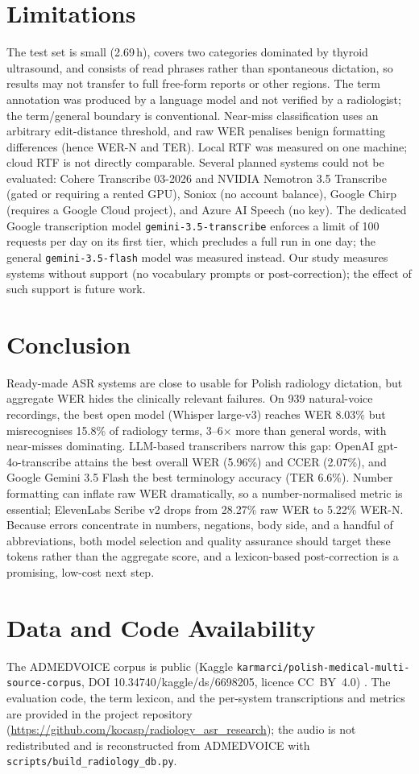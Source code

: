 \documentclass[conference]{IEEEtran}
\begin{document}
\section{Limitations}
The test set is small (2.69\,h), covers two categories dominated by thyroid ultrasound, and consists of read phrases rather than spontaneous dictation, so results may not transfer to full free-form reports or other regions. The term annotation was produced by a language model and not verified by a radiologist; the term/general boundary is conventional. Near-miss classification uses an arbitrary edit-distance threshold, and raw WER penalises benign formatting differences (hence WER-N and TER). Local RTF was measured on one machine; cloud RTF is not directly comparable. Several planned systems could not be evaluated: Cohere Transcribe 03-2026 and NVIDIA Nemotron 3.5 Transcribe (gated or requiring a rented GPU), Soniox (no account balance), Google Chirp (requires a Google Cloud project), and Azure AI Speech (no key). The dedicated Google transcription model \texttt{gemini-3.5-transcribe} enforces a limit of 100 requests per day on its first tier, which precludes a full run in one day; the general \texttt{gemini-3.5-flash} model was measured instead. Our study measures systems without support (no vocabulary prompts or post-correction); the effect of such support is future work.

\section{Conclusion}
Ready-made ASR systems are close to usable for Polish radiology dictation, but aggregate WER hides the clinically relevant failures. On 939 natural-voice recordings, the best open model (Whisper large-v3) reaches WER 8.03\% but misrecognises 15.8\% of radiology terms, 3--6$\times$ more than general words, with near-misses dominating. LLM-based transcribers narrow this gap: OpenAI gpt-4o-transcribe attains the best overall WER (5.96\%) and CCER (2.07\%), and Google Gemini 3.5 Flash the best terminology accuracy (TER 6.6\%). Number formatting can inflate raw WER dramatically, so a number-normalised metric is essential; ElevenLabs Scribe v2 drops from 28.27\% raw WER to 5.22\% WER-N. Because errors concentrate in numbers, negations, body side, and a handful of abbreviations, both model selection and quality assurance should target these tokens rather than the aggregate score, and a lexicon-based post-correction is a promising, low-cost next step.

\section*{Data and Code Availability}
The ADMEDVOICE corpus is public (Kaggle \texttt{karmarci/polish-medical-multi-source-corpus}, DOI 10.34740/kaggle/ds/6698205, licence CC~BY~4.0) \cite{r1}. The evaluation code, the term lexicon, and the per-system transcriptions and metrics are provided in the project repository (\url{https://github.com/kocasp/radiology_asr_research}); the audio is not redistributed and is reconstructed from ADMEDVOICE with \texttt{scripts/build\_radiology\_db.py}.
\end{document}
